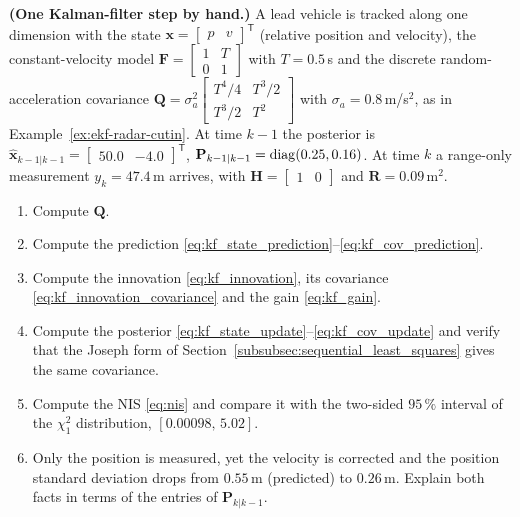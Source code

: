 \begin{prob}\label{prob:ch03:4}
\textbf{(One Kalman-filter step by hand.)} A lead vehicle is tracked along one dimension with the state $\mathbf{x}=\begin{bmatrix}p&v\end{bmatrix}^{\mathsf T}$ (relative position and velocity), the constant-velocity model $\mathbf{F}=\begin{bmatrix}1&T\\0&1\end{bmatrix}$ with $T=0.5$\,s and the discrete random-acceleration covariance $\mathbf{Q}=\sigma_a^{2}\begin{bmatrix}T^{4}/4&T^{3}/2\\T^{3}/2&T^{2}\end{bmatrix}$ with $\sigma_a=0.8$\,m/s$^{2}$, as in Example~\ref{ex:ekf-radar-cutin}. At time $k-1$ the posterior is $\widehat{\mathbf{x}}_{k-1|k-1}=\begin{bmatrix}50.0&-4.0\end{bmatrix}^{\mathsf T}$, $\mathbf{P}_{k-1|k-1}=\operatorname{diag}(0.25,0.16)$. At time $k$ a range-only measurement $y_k=47.4$\,m arrives, with $\mathbf{H}=\begin{bmatrix}1&0\end{bmatrix}$ and $\mathbf{R}=0.09$\,m$^{2}$.
\begin{enumerate}
\item[(a)] Compute $\mathbf{Q}$.
\item[(b)] Compute the prediction \eqref{eq:kf_state_prediction}--\eqref{eq:kf_cov_prediction}.
\item[(c)] Compute the innovation \eqref{eq:kf_innovation}, its covariance \eqref{eq:kf_innovation_covariance} and the gain \eqref{eq:kf_gain}.
\item[(d)] Compute the posterior \eqref{eq:kf_state_update}--\eqref{eq:kf_cov_update} and verify that the Joseph form of Section~\ref{subsubsec:sequential_least_squares} gives the same covariance.
\item[(e)] Compute the NIS \eqref{eq:nis} and compare it with the two-sided $95\,\%$ interval of the $\chi^{2}_{1}$ distribution, $[0.00098,\,5.02]$.
\item[(f)] Only the position is measured, yet the velocity is corrected and the position standard deviation drops from $0.55$\,m (predicted) to $0.26$\,m. Explain both facts in terms of the entries of $\mathbf{P}_{k|k-1}$.
\end{enumerate}
\end{prob}

